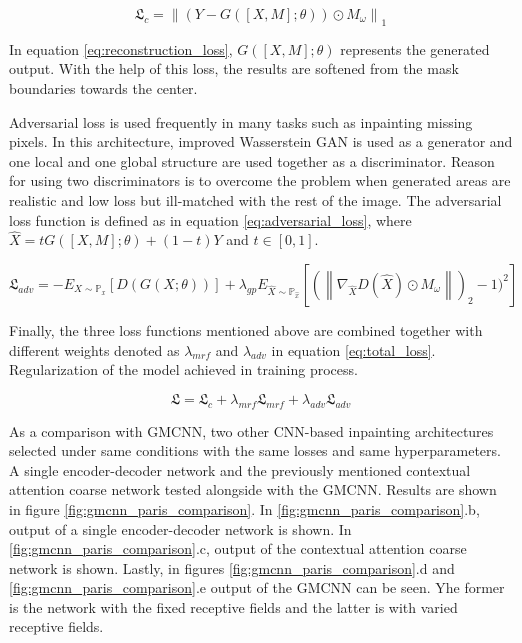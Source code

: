 \begin{equation}
    \mathfrak{L}_{c} = \left \| (Y - G([X, M]; \theta )) \odot M_{\omega} \right \|_{1}
    \label{eq:reconstruction_loss}
\end{equation}

In equation \ref{eq:reconstruction_loss}, \(G([X, M]; \theta )\) represents the generated output. With the help of this loss, the results are softened from the mask boundaries towards the center.

Adversarial loss is used frequently in many tasks such as inpainting missing pixels. In this architecture, improved Wasserstein GAN \cite{improved_train_wgan} is used as a generator and one local and one global structure are used together as a discriminator. Reason for using two discriminators is to overcome the problem when generated areas are realistic and low loss but ill-matched with the rest of the image. The adversarial loss function is defined as in equation \ref{eq:adversarial_loss}, where \(\widehat{X} = tG([X, M]; \theta) + (1 - t) Y\) and \(t \in [0, 1]\).

\begin{equation}
    \mathfrak{L}_{adv} = - E_{X \sim \mathbb{P}_{x}}[D(G(X;\theta))] + \lambda_{gp} E_{\widehat{X} \sim \mathbb{P}_{\widehat{x}}}[(\left \| \nabla_{\widehat{X}} D(\widehat{X}) \odot M_{\omega} \right \|)_{2} - 1)^{2}]
    \label{eq:adversarial_loss}
\end{equation}

Finally, the three loss functions mentioned above are combined together with different weights denoted as \(\lambda_{mrf}\) and \(\lambda_{adv}\) in equation \ref{eq:total_loss}. Regularization of the model achieved in training process.

\begin{equation}
    \mathfrak{L} = \mathfrak{L}_{c} + \lambda_{mrf} \mathfrak{L}_{mrf} + \lambda_{adv} \mathfrak{L}_{adv}
    \label{eq:total_loss}
\end{equation}

As a comparison with GMCNN, two other CNN-based inpainting architectures selected under same conditions with the same losses and same hyperparameters. A single encoder-decoder network and the previously mentioned contextual attention coarse network \cite{generative_contextual} tested alongside with the GMCNN. Results are shown in figure \ref{fig:gmcnn_paris_comparison}. In \ref{fig:gmcnn_paris_comparison}.b, output of a single encoder-decoder network is shown. In \ref{fig:gmcnn_paris_comparison}.c, output of the contextual attention
coarse network is shown. Lastly, in figures \ref{fig:gmcnn_paris_comparison}.d and \ref{fig:gmcnn_paris_comparison}.e output of the GMCNN can be seen. Yhe former is the network with the fixed receptive fields and the latter is with varied receptive fields.

